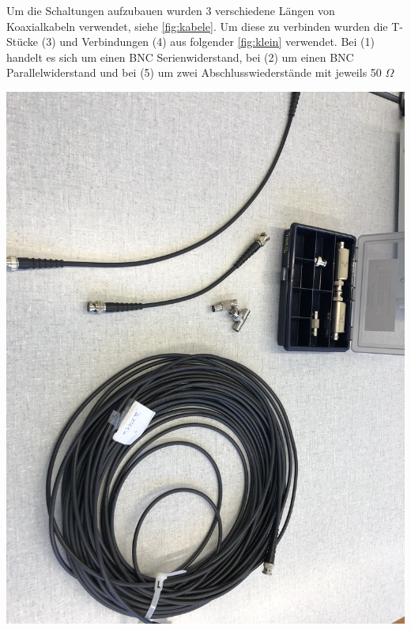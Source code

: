 \documentclass[11pt,ngerman]{scrartcl}
\begin{document}
\noindent Um die Schaltungen aufzubauen wurden 3 verschiedene Längen von
Koaxialkabeln verwendet, siehe \autoref{fig:kabele}. Um diese zu verbinden
wurden die T-Stücke (3) und Verbindungen (4) aus folgender \autoref{fig:klein}
verwendet. Bei (1) handelt es sich um einen BNC Serienwiderstand, bei (2) um
einen BNC Parallelwiderstand und bei (5) um zwei Abschlusswiederstände mit
jeweils 50 $\Omega$

\vspace{2mm}

\begin{minipage}{\textwidth}
	\begin{minipage}[t]{0.5\textwidth}
		\centering
		\includegraphics[width=\textwidth]{material}
		\label{fig:kabele}
	\end{minipage}
	\vspace{2mm}
	\begin{minipage}[t]{0.50\textwidth}
		\centering

\end{minipage}
\end{minipage}
\end{document}
